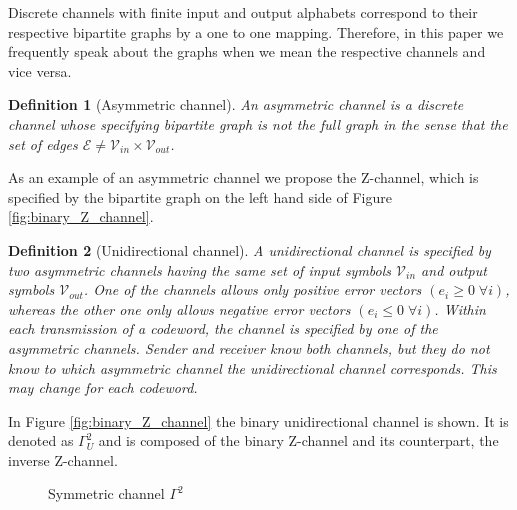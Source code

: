 \documentclass[conference]{IEEEtran}
\newtheorem{Definition}{Definition}
\begin{document}
Discrete channels with finite input and output alphabets correspond to their respective bipartite graphs by a one to one mapping. Therefore, in this paper we frequently speak about the graphs when we mean the respective channels and vice versa.

\begin{Definition}[Asymmetric channel]
	An asymmetric channel is a discrete channel whose specifying bipartite graph is not the full graph in the sense that the set of edges $\mathcal{E} \neq \mathcal{V}_{in} \times \mathcal{V}_{out}$.
\end{Definition}

As an example of an asymmetric channel we propose the Z-channel, which is specified by the bipartite graph on the left hand side of Figure \ref{fig:binary_Z_channel}.




\begin{Definition}[Unidirectional channel]
	A unidirectional channel is specified by two asymmetric channels having the same set of input symbols $\mathcal{V}_{in}$ and output symbols $\mathcal{V}_{out}$. One of the channels allows only positive error vectors $(e_i \geq 0 \; \forall i)$, whereas the other one only allows negative error vectors $(e_i \leq 0 \; \forall i)$. Within each transmission of a codeword, the channel is specified by one of the asymmetric channels. Sender and receiver know both channels, but they do not know to which asymmetric channel the unidirectional channel corresponds. This may change for each codeword.
\end{Definition}


In Figure \ref{fig:binary_Z_channel} the binary unidirectional channel is shown. It is denoted as $\Gamma_U^2$ and is composed of the binary Z-channel and its counterpart, the inverse Z-channel.


%	


\begin{figure}
	\centering
	\caption{Symmetric channel $\Gamma^2$}
	\label{fig:symmetric_channel}
\end{figure}
\end{document}
